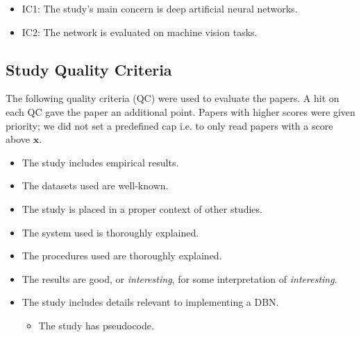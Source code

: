 \documentclass[11pt]{article}
\begin{document}
\begin{itemize}
 \item IC1: The study's main concern is deep artificial neural networks.
 \item IC2: The network is evaluated on machine vision tasks.
\end{itemize}

\subsection{Study Quality Criteria}

The following quality criteria (QC) were used to evaluate the papers.  A hit on each QC gave the paper an additional point.  Papers with higher scores were given priority; we did not set a predefined cap i.e. to only read papers with a score above $\mathbf{x}$.

\begin{itemize}
 \item The study includes empirical results.
 \item The datasets used are well-known.
 \item The study is placed in a proper context of other studies.
 \item The system used is thoroughly explained.
 \item The procedures used are thoroughly explained.
 \item The results are good, or \textit{interesting}, for some interpretation of \textit{interesting}.
 \item The study includes details relevant to implementing a DBN.
   \begin{itemize}
   \item The study has pseudocode.
   \end{itemize}
\end{itemize}
\end{document}
